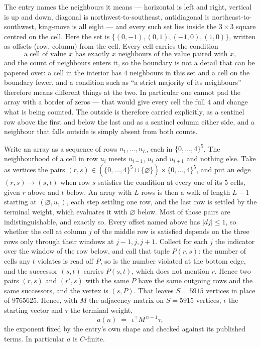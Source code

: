 \documentclass[11pt,a4paper]{article}
\theoremstyle{plain}
\theoremstyle{definition}
\begin{document}
The entry names the neighbours it means --- horizontal is left and right, vertical is up and
down, diagonal is northwest-to-southeast, antidiagonal is northeast-to-southwest, king-move is
all eight --- and every such set lies inside the $3\times3$ square centred on the cell. Here
the set is $\{(0,-1), (0,1), (-1,0), (1,0)\}$, written as offsets (row, column) from the cell. Every cell carries
the condition
\[
\text{a cell of value }x\text{ has exactly }x\text{ neighbours of the value paired with }x,
\]
and the count of neighbours enters it, so the boundary is not a detail that can be papered
over: a cell in the interior has $4$ neighbours in this set and a cell on the boundary
fewer, and a condition such as ``a strict majority of its neighbours'' therefore means
different things at the two. In particular one cannot pad the array with a border of zeros ---
that would give every cell the full $4$ and change what is being counted. The outside is
therefore carried
explicitly, as a sentinel row above the first and below the last and as a sentinel column
either side, and a neighbour that falls outside is simply absent from both counts.

Write an array as a sequence of rows $u_1,\dots,u_L$, each in
$\{0,\dots,4\}^{5}$. The neighbourhood of a cell in row $u_i$ meets $u_{i-1}$,
$u_i$ and $u_{i+1}$ and nothing else. Take as vertices the pairs
$(r,s)\in(\{0,\dots,4\}^{5}\cup\{\varnothing\})\times\{0,\dots,4\}^{5}$,
and put an edge $(r,s)\to(s,t)$ when row $s$ satisfies the condition at every one of its
$5$ cells, given $r$ above and $t$ below. An array with $L$ rows is then a walk of length
$L-1$ starting at $(\varnothing,u_1)$, each step settling one row, and the last row is
settled by the terminal weight, which evaluates it with $\varnothing$ below. Most of those pairs are indistinguishable, and exactly so. Every offset named above has $|dj|\le 1$, so whether the cell at column $j$ of the middle row is satisfied depends on the three rows only through their windows at $j-1,j,j+1$. Collect for each $j$ the indicator over the window of the row below, and call that tuple $P(r,s)$: the number of cells any $t$ violates is read off $P$, so is the number violated at the bottom edge, and the successor $(s,t)$ carries $P(s,t)$, which does not mention $r$. Hence two pairs $(r,s)$ and $(r',s)$ with the same $P$ have the same outgoing rows and the same successors, and the vertex is $(s,P)$. That leaves $S=5915$ vertices in place of $9765625$. Hence,
with $M$ the adjacency matrix on $S=5915$ vertices, $\iota$ the starting vector and $\tau$ the
terminal weight,
\[
a(n)\;=\;\,\iota^{\!\top}M^{\,n-1}\tau ,
\]
the exponent fixed by the entry's own shape and checked against its published terms. In
particular $a$ is $C$-finite.
\end{document}
